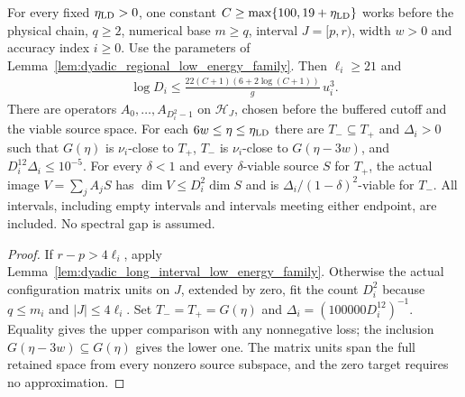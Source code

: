 \begin{lemma}
    \label{lem:dyadic_interval_low_energy_family}
    \leanok
    For every fixed $\eta_{\rm LD}>0$, one constant
    $C\ge\max\{100,19+\eta_{\rm LD}\}$ works before the physical
    chain, $q\ge2$, numerical base $m\ge q$, interval $J=[p,r)$,
    width $w>0$ and accuracy index $i\ge0$. Use the parameters of
    Lemma~\ref{lem:dyadic_regional_low_energy_family}.
    Then $\ell_i\ge21$ and
    \begin{align*}
        \log D_i\le
        \frac{22(C+1)(6+2\log(C+1))}{g}\,u_i^3.
    \end{align*}
    There are operators $A_0,\ldots,A_{D_i^2-1}$ on $\mathcal H_J$,
    chosen before the buffered cutoff and the viable source space.
    For each $6w\le\eta\le\eta_{\rm LD}$ there are
    $T_-\subseteq T_+$ and $\Delta_i>0$ such that $G(\eta)$ is
    $\nu_i$-close to $T_+$, $T_-$ is $\nu_i$-close to
    $G(\eta-3w)$, and $D_i^{12}\Delta_i\le10^{-5}$.
    For every $\delta<1$ and every $\delta$-viable source $S$ for
    $T_+$, the actual image $V=\sum_j A_jS$ has
    $\dim V\le D_i^2\dim S$ and is
    $\Delta_i/(1-\delta)^2$-viable for $T_-$.
    All intervals, including empty intervals and intervals meeting
    either endpoint, are included. No spectral gap is assumed.
\end{lemma}
\begin{proof}\leanok
    If $r-p>4\ell_i$, apply
    Lemma~\ref{lem:dyadic_long_interval_low_energy_family}.
    Otherwise the actual configuration matrix units on $J$, extended
    by zero, fit the count $D_i^2$ because $q\le m_i$ and
    $|J|\le4\ell_i$. Set $T_-=T_+=G(\eta)$ and
    $\Delta_i=(100000D_i^{12})^{-1}$.
    Equality gives the upper comparison with any nonnegative loss;
    the inclusion $G(\eta-3w)\subseteq G(\eta)$ gives the lower one.
    The matrix units span the full retained space from every nonzero
    source subspace, and the zero target requires no approximation.
\end{proof}
